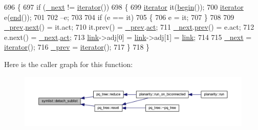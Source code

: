 \begin{DoxyCode}
696 \{
697     \textcolor{keywordflow}{if} (\mbox{\hyperlink{classsymlist_a376c701eae20490b74a6866124bcb24c}{\_next}} != \mbox{\hyperlink{classsymlist_a66045fbe3d98975e5537092ede8b50df}{iterator}}())
698     \{
699     \mbox{\hyperlink{classsymlist_a66045fbe3d98975e5537092ede8b50df}{iterator}} it(\mbox{\hyperlink{classsymlist_a525b8d44af5d771fe15916372515cce0}{begin}}());
700     \mbox{\hyperlink{classsymlist_a66045fbe3d98975e5537092ede8b50df}{iterator}} e(\mbox{\hyperlink{classsymlist_a7283589fa01f79d722f8256d7a6a7883}{end}}());
701     
702     --e;
703     
704     \textcolor{keywordflow}{if} (e == it)
705     \{
706         e = it;
707     \}
708 
709     \mbox{\hyperlink{classsymlist_ac5e2276db5018abebf297079a324ed9e}{\_prev}}.\mbox{\hyperlink{structsymlist__iterator_ad363a9756ff599c960668320a93532ed}{next}}() = it.act;
710     it.prev() = \mbox{\hyperlink{classsymlist_ac5e2276db5018abebf297079a324ed9e}{\_prev}}.\mbox{\hyperlink{structsymlist__iterator_a1c7a0193ab85baa7705070975d841fc8}{act}};
711     \mbox{\hyperlink{classsymlist_a376c701eae20490b74a6866124bcb24c}{\_next}}.\mbox{\hyperlink{structsymlist__iterator_a30f1c0a962713ded0c24871093089fb0}{prev}}() = e.act;
712     e.next() = \mbox{\hyperlink{classsymlist_a376c701eae20490b74a6866124bcb24c}{\_next}}.\mbox{\hyperlink{structsymlist__iterator_a1c7a0193ab85baa7705070975d841fc8}{act}};
713     \mbox{\hyperlink{classsymlist_a8fa81a7f6d0bb986bb593776db582c90}{link}}->adj[0] = \mbox{\hyperlink{classsymlist_a8fa81a7f6d0bb986bb593776db582c90}{link}}->adj[1] = \mbox{\hyperlink{classsymlist_a8fa81a7f6d0bb986bb593776db582c90}{link}};
714 
715     \mbox{\hyperlink{classsymlist_a376c701eae20490b74a6866124bcb24c}{\_next}} = \mbox{\hyperlink{classsymlist_a66045fbe3d98975e5537092ede8b50df}{iterator}}();
716     \mbox{\hyperlink{classsymlist_ac5e2276db5018abebf297079a324ed9e}{\_prev}} = \mbox{\hyperlink{classsymlist_a66045fbe3d98975e5537092ede8b50df}{iterator}}();
717     \}
718 \}
\end{DoxyCode}
Here is the caller graph for this function\+:\nopagebreak
\begin{figure}[H]
\begin{center}
\leavevmode
\includegraphics[width=350pt]{classsymlist_a784f81bf9dfbfc1865f188a82681779f_icgraph}
\end{center}
\end{figure}
\mbox{\label{classsymlist_aca11cd6c621376bc52a18828ef92e753}} 
